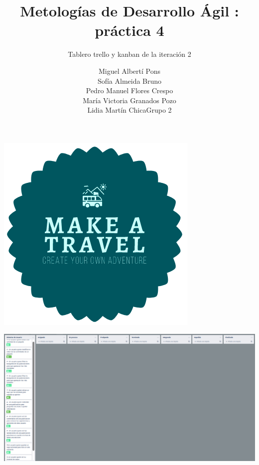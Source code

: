 \documentclass[spanish]{beamer}
\title{Metologías de Desarrollo Ágil : práctica 4}
\subtitle{Tablero trello y kanban de la iteración 2}
\author{Miguel Albertí Pons\\ Sofía Almeida Bruno\\ Pedro Manuel Flores Crespo\\ María Victoria Granados Pozo\\ Lidia Martín Chica\vspace{1em}Grupo 2}
\begin{document}
\maketitle

\begin{frame}
\centering
\begin{center}
		\includegraphics[scale=0.4]{../../Imagenes/Logo}
	\end{center}
\end{frame}

\begin{frame}
\centering
	\begin{center}
		\includegraphics[scale=0.25]{trello2_1}
	\end{center}
\end{frame}


\begin{frame}
	\begin{center}
	\end{center}
\end{frame}
\end{document}
